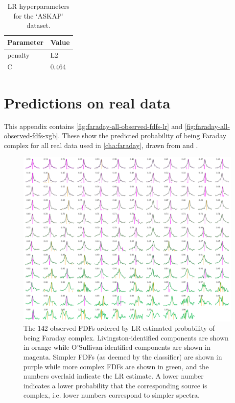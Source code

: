   \begin{table}[htbp]
    \caption{\label{tab:faraday-hyperparameters-lr-askap12} LR hyperparameters for the `ASKAP' dataset.}
    \centering
    \begin{tabular}{ll}
      \hline\hline
      Parameter & Value\\\hline
      penalty & L2\\
      C & 0.464\\
      \hline\hline
    \end{tabular}
  \end{table}

\section{Predictions on real data}
\label{sec:faraday-real-data-fig}

  This appendix contains \autoref{fig:faraday-all-observed-fdfs-lr} and \autoref{fig:faraday-all-observed-fdfs-xgb}. These show the predicted probability of being Faraday complex for all real data used in \autoref{cha:faraday}, drawn from \citet{livingston21faraday} and \citet{osullivan_broad-band_2017}.

  \begin{figure}
    \centering
    \includegraphics[width=\linewidth]{faraday-images/both_spectra_lr.pdf}
    \caption[The 142 observed FDFs ordered by LR-estimated probability of being Faraday complex.]{The 142 observed FDFs ordered by LR-estimated probability of being Faraday complex. Livingston-identified components are shown in orange while O'Sullivan-identified components are shown in magenta. Simpler FDFs (as deemed by the classifier) are shown in purple while more complex FDFs are shown in green, and the numbers overlaid indicate the LR estimate. A lower number indicates a lower probability that the corresponding source is complex, i.e. lower numbers correspond to simpler spectra.}
    \label{fig:faraday-all-observed-fdfs-lr}
  \end{figure}

